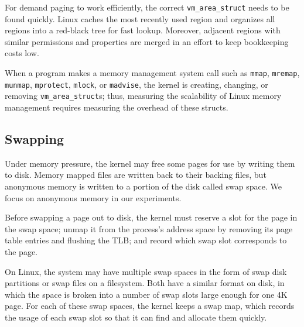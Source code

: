 \documentclass[twocolumn,11pt]{article}
\begin{document}
For demand paging to work efficiently, the correct \texttt{vm\_area\_struct}
needs to be found quickly. Linux caches the most recently used region and
organizes all regions into a red-black tree for fast lookup.  Moreover,
adjacent regions with similar permissions and properties are merged in an
effort to keep bookkeeping costs low.


When a program makes a memory
management system call such as \texttt{mmap}, \texttt{mremap}, \texttt{munmap},
\texttt{mprotect}, \texttt{mlock}, or \texttt{madvise}, the kernel is creating,
changing, or removing \texttt{vm\_area\_struct}s; thus, measuring the
scalability of Linux memory management requires measuring the overhead of these
structs.

\subsection{Swapping}

Under memory pressure, the kernel may free some pages for use by writing
them to disk. Memory mapped files are written back to their backing files,
but anonymous memory is written to a portion of the disk called swap space. We
focus on anonymous memory in our experiments.

Before swapping a page out to disk, the kernel must reserve a slot for the page
in the swap space; unmap it from the process's address space by removing its
page table entries and flushing the TLB; and record which swap slot corresponds
to the page.

On Linux, the system may have multiple swap spaces in the form of swap disk
partitions or swap files on a filesystem. Both have a similar format on disk,
in which the space is broken into a number of swap slots large enough for one
4K page. For each of these swap spaces, the kernel keeps a swap map, which records
the usage of each swap slot so that it can find and allocate them quickly.
\end{document}
